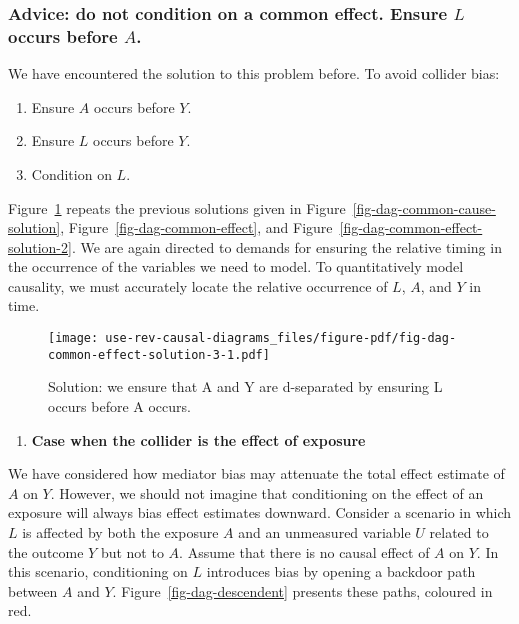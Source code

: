 \documentclass[
  singlecolumn,
  9pt]{article}
\providecommand{\tightlist}{%
  \setlength{\itemsep}{0pt}\setlength{\parskip}{0pt}}\usepackage{longtable,booktabs,array}
\begin{document}
\subsubsection{\texorpdfstring{Advice: do not condition on a common
effect. Ensure \(L\) occurs before
\(A\).}{Advice: do not condition on a common effect. Ensure L occurs before A.}}\label{advice-do-not-condition-on-a-common-effect.-ensure-l-occurs-before-a.}

We have encountered the solution to this problem before. To avoid
collider bias:

\begin{enumerate}
\def\labelenumi{\arabic{enumi}.}
\tightlist
\item
  Ensure \(A\) occurs before \(Y\).
\item
  Ensure \(L\) occurs before \(Y\).
\item
  Condition on \(L\).
\end{enumerate}

Figure~\ref{fig-dag-common-effect-solution-3} repeats the previous
solutions given in Figure~\ref{fig-dag-common-cause-solution},
Figure~\ref{fig-dag-common-effect}, and
Figure~\ref{fig-dag-common-effect-solution-2}. We are again directed to
demands for ensuring the relative timing in the occurrence of the
variables we need to model. To quantitatively model causality, we must
accurately locate the relative occurrence of \(L\), \(A\), and \(Y\) in
time.

\begin{figure}

{\centering \texttt{[image: use-rev-causal-diagrams\_files/figure-pdf/fig-dag-common-effect-solution-3-1.pdf]}

}

\caption{\label{fig-dag-common-effect-solution-3}Solution: we ensure
that A and Y are d-separated by ensuring L occurs before A occurs.}

\end{figure}

\begin{enumerate}
\def\labelenumi{\arabic{enumi}.}
\setcounter{enumi}{1}
\tightlist
\item
  \textbf{Case when the collider is the effect of exposure}
\end{enumerate}

We have considered how mediator bias may attenuate the total effect
estimate of \(A\) on \(Y\). However, we should not imagine that
conditioning on the effect of an exposure will always bias effect
estimates downward. Consider a scenario in which \(L\) is affected by
both the exposure \(A\) and an unmeasured variable \(U\) related to the
outcome \(Y\) but not to \(A\). Assume that there is no causal effect of
\(A\) on \(Y\). In this scenario, conditioning on \(L\) introduces bias
by opening a backdoor path between \(A\) and \(Y\).
Figure~\ref{fig-dag-descendent} presents these paths, coloured in red.
\end{document}
